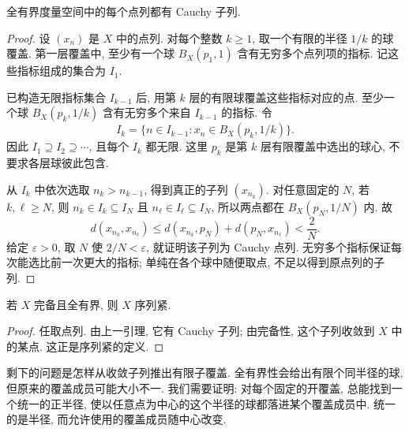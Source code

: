 \begin{lemma}[全有界空间中的子列抽取]
\label{ch:compact:total-to-cauchy-subsequence}
全有界度量空间中的每个点列都有 Cauchy 子列.
\end{lemma}
\begin{proof}
设 $(x_n)$ 是 $X$ 中的点列. 对每个整数 $k\geq1$, 取一个有限的半径 $1/k$ 的球覆盖. 第一层覆盖中, 至少有一个球 $B_X(p_1,1)$ 含有无穷多个点列项的指标. 记这些指标组成的集合为 $I_1$.

已构造无限指标集合 $I_{k-1}$ 后, 用第 $k$ 层的有限球覆盖这些指标对应的点. 至少一个球 $B_X(p_k,1/k)$ 含有无穷多个来自 $I_{k-1}$ 的指标. 令
\[
 I_k=\{n\in I_{k-1}:x_n\in B_X(p_k,1/k)\}.
\]
因此 $I_1\supseteq I_2\supseteq\cdots$, 且每个 $I_k$ 都无限. 这里 $p_k$ 是第 $k$ 层有限覆盖中选出的球心, 不要求各层球彼此包含.

从 $I_k$ 中依次选取 $n_k>n_{k-1}$, 得到真正的子列 $(x_{n_k})$. 对任意固定的 $N$, 若 $k,\ell\geq N$, 则 $n_k\in I_k\subseteq I_N$ 且 $n_\ell\in I_\ell\subseteq I_N$, 所以两点都在 $B_X(p_N,1/N)$ 内. 故
\begin{equation}
 d(x_{n_k},x_{n_\ell})
 \leq d(x_{n_k},p_N)+d(p_N,x_{n_\ell})<\frac2N.
 \label{ch:compact:two-over-n}
\end{equation}
给定 $\varepsilon>0$, 取 $N$ 使 $2/N<\varepsilon$, 就证明该子列为 Cauchy 点列. 无穷多个指标保证每次能选比前一次更大的指标; 单纯在各个球中随便取点, 不足以得到原点列的子列.
\end{proof}

\begin{corollary}[完备且全有界推出序列紧]
\label{ch:compact:complete-total-to-sequential}
若 $X$ 完备且全有界, 则 $X$ 序列紧.
\end{corollary}
\begin{proof}
任取点列. 由上一引理, 它有 Cauchy 子列; 由完备性, 这个子列收敛到 $X$ 中的某点. 这正是序列紧的定义.
\end{proof}

剩下的问题是怎样从收敛子列推出有限子覆盖. 全有界性会给出有限个同半径的球, 但原来的覆盖成员可能大小不一. 我们需要证明: 对每个固定的开覆盖, 总能找到一个统一的正半径, 使以任意点为中心的这个半径的球都落进某个覆盖成员中. 统一的是半径, 而允许使用的覆盖成员随中心改变.


